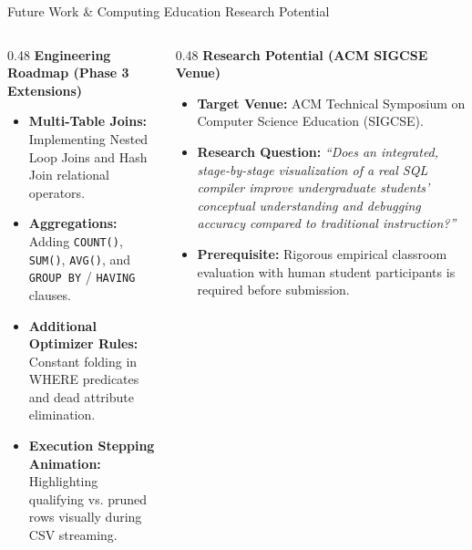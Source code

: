 \documentclass[aspectratio=169,10pt]{beamer}
\begin{document}
\begin{frame}{Future Work \& Computing Education Research Potential}
    \begin{columns}[T]
        \begin{column}{0.48\textwidth}
            \textbf{Engineering Roadmap (Phase 3 Extensions)}
            \begin{itemize}\footnotesize
                \item \textbf{Multi-Table Joins:} Implementing Nested Loop Joins and Hash Join relational operators.
                \item \textbf{Aggregations:} Adding \texttt{COUNT()}, \texttt{SUM()}, \texttt{AVG()}, and \texttt{GROUP BY} / \texttt{HAVING} clauses.
                \item \textbf{Additional Optimizer Rules:} Constant folding in WHERE predicates and dead attribute elimination.
                \item \textbf{Execution Stepping Animation:} Highlighting qualifying vs. pruned rows visually during CSV streaming.
            \end{itemize}
        \end{column}
        \begin{column}{0.48\textwidth}
            \textbf{Research Potential (ACM SIGCSE Venue)}
            \begin{itemize}\footnotesize
                \item \textbf{Target Venue:} ACM Technical Symposium on Computer Science Education (SIGCSE).
                \item \textbf{Research Question:} \textit{“Does an integrated, stage-by-stage visualization of a real SQL compiler improve undergraduate students' conceptual understanding and debugging accuracy compared to traditional instruction?”}
                \item \textbf{Prerequisite:} Rigorous empirical classroom evaluation with human student participants is required before submission.
            \end{itemize}
        \end{column}
    \end{columns}
\end{frame}
\end{document}
